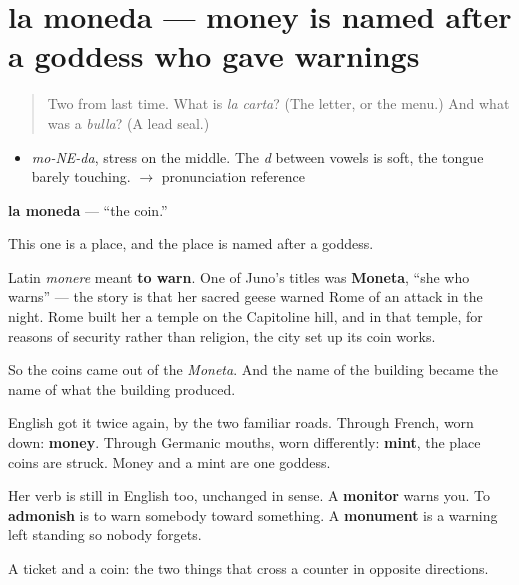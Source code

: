 \section[la moneda]{la moneda — money is named after a goddess who gave warnings}

\label{lesson:ES-C313-moneda}



\begin{quote}
Two from last time. What is \emph{la carta}? (The letter, or the menu.) And what was a \emph{bulla}? (A lead seal.)
\end{quote}

\begin{sounds}
\begin{itemize}
\raggedright
  \item \emph{mo-NE-da}, stress on the middle. The \emph{d} between vowels is soft, the tongue barely touching. $\to$ pronunciation reference
\end{itemize}
\end{sounds}

\begin{cousinweb}
\textbf{la moneda} — \textquotedblleft{}the coin.\textquotedblright{}

This one is a place, and the place is named after a goddess.

Latin \emph{monere} meant \textbf{to warn}. One of Juno's titles was \textbf{Moneta}, \textquotedblleft{}she who warns\textquotedblright{} — the story is that her sacred geese warned Rome of an attack in the night. Rome built her a temple on the Capitoline hill, and in that temple, for reasons of security rather than religion, the city set up its coin works.

So the coins came out of the \emph{Moneta}. And the name of the building became the name of what the building produced.

English got it twice again, by the two familiar roads. Through French, worn down: \textbf{money}. Through Germanic mouths, worn differently: \textbf{mint}, the place coins are struck. Money and a mint are one goddess.

Her verb is still in English too, unchanged in sense. A \textbf{monitor} warns you. To \textbf{admonish} is to warn somebody toward something. A \textbf{monument} is a warning left standing so nobody forgets.
\end{cousinweb}

\begin{grammarlens}[title={What you've built}]
A ticket and a coin: the two things that cross a counter in opposite directions.
\end{grammarlens}

